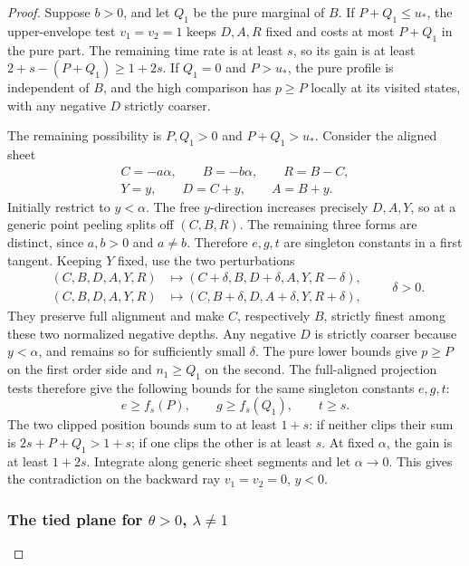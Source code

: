 \begin{proof}
Suppose \(b>0\), and let \(Q_1\) be the pure marginal of \(B\).
If \(P+Q_1\le u_*\), the upper-envelope test \(v_1=v_2=1\) keeps
\(D,A,R\) fixed and costs at most \(P+Q_1\) in the pure part. The
remaining time rate is at least \(s\), so its gain is at least
\(2+s-(P+Q_1)\ge1+2s\). If \(Q_1=0\) and \(P>u_*\), the pure
profile is independent of \(B\), and the high comparison has \(p\ge P\)
locally at its visited states, with any negative \(D\) strictly coarser.

The remaining possibility is \(P,Q_1>0\) and \(P+Q_1>u_*\).
Consider the aligned sheet
\begin{equation}\label{eq:source-21}
\begin{gathered}
C=-a\alpha,\qquad B=-b\alpha,\qquad R=B-C,\\
Y=y,\qquad D=C+y,\qquad A=B+y .
\end{gathered}
\end{equation}
Initially restrict to \(y<\alpha\). The free \(y\)-direction increases
precisely \(D,A,Y\), so at a generic point peeling splits off
\((C,B,R)\). The remaining three forms are distinct, since
\(a,b>0\) and \(a\ne b\). Therefore \(e,g,t\) are singleton constants
in a first tangent. Keeping \(Y\) fixed, use the two perturbations
\begin{equation}\label{asp:aligned-perturbations}
\begin{aligned}
(C,B,D,A,Y,R)&\longmapsto(C+\delta,B,D+\delta,A,Y,R-\delta),\\
(C,B,D,A,Y,R)&\longmapsto(C,B+\delta,D,A+\delta,Y,R+\delta),
\end{aligned}
\qquad \delta>0.
\end{equation}
They preserve full alignment and make \(C\), respectively \(B\),
strictly finest among these two normalized negative depths. Any negative
\(D\) is strictly coarser because \(y<\alpha\), and remains so for
sufficiently small \(\delta\). The pure lower bounds give
\(p\ge P\) on the first order side and \(n_1\ge Q_1\) on the
second. The full-aligned projection tests therefore give the following
bounds for the same singleton constants \(e,g,t\):
\[
e\ge f_s(P),\qquad g\ge f_s(Q_1),\qquad t\ge s.
\]
The two clipped position bounds sum to at least \(1+s\): if neither
clips their sum is \(2s+P+Q_1>1+s\); if one clips the other is
at least \(s\). At fixed \(\alpha\), the gain is at
least \(1+2s\). Integrate along generic sheet segments and let
\(\alpha\to0\). This gives the contradiction on the backward ray
\(v_1=v_2=0\), \(y<0\).

\subsubsection*{The tied plane for \(\theta>0\), \(\lambda\ne1\)}


\end{proof}
